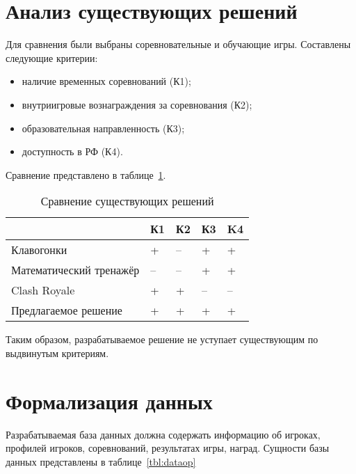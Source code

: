 \section{Анализ существующих решений}

Для сравнения были выбраны соревновательные и обучающие игры. Составлены следующие критерии:
\begin{itemize}
	\item наличие временных соревнований (К1);
	\item внутриигровые вознаграждения за соревнования (К2);
	\item образовательная направленность (К3);
	\item доступность в РФ (К4).
\end{itemize}

Сравнение представлено в таблице~\ref{tbl:comparison}. 

\begin{table}[h!]
	\centering
	\caption{\label{tbl:comparison}Сравнение существующих решений}
	\begin{tabular}{|l|l|l|l|l|}
		\hline
		& К1 & К2 & К3 & K4\\\hline
		Клавогонки & + & -- & + & + \\\hline
		Математический тренажёр & -- & -- & + & +\\\hline
		Clash Royale  & + & + & -- & --\\\hline
		Предлагаемое решение & + & + & + & + \\\hline
	\end{tabular}
\end{table}
\FloatBarrier

Таким образом, разрабатываемое решение не уступает существующим по выдвинутым критериям.

\section{Формализация данных}
Разрабатываемая база данных должна содержать информацию об игроках, профилей игроков, соревнований, результатах игры, наград. Сущности базы данных представлены в таблице~\ref{tbl:dataop}

